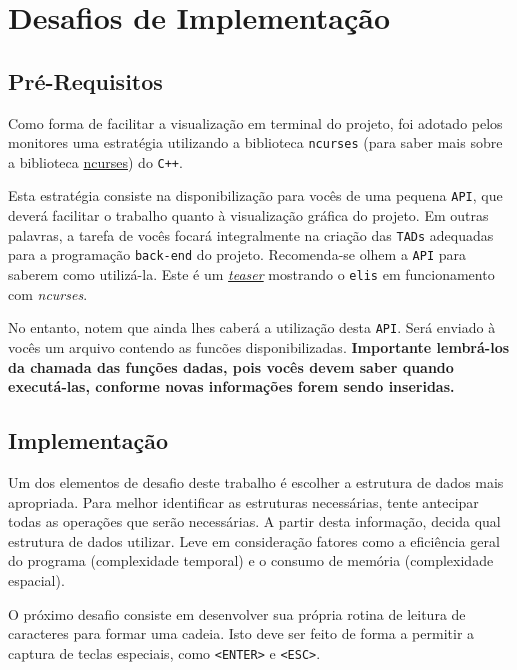 \documentclass[11pt,a4paper]{article}
\begin{document}
\section{Desafios de Implementação}
\label{subsec:parteI:desafios}

\subsection{Pré-Requisitos}

Como forma de facilitar a visualização em terminal do projeto, foi adotado pelos monitores uma estratégia utilizando a biblioteca \texttt{ncurses} (para saber mais sobre a biblioteca \href{http://bit.do/eAJR6}{ncurses}) do \texttt{C++}.



Esta estratégia consiste na disponibilização para vocês de uma pequena \texttt{API}, que deverá facilitar o trabalho quanto à visualização gráfica do projeto. Em outras palavras, a tarefa de vocês focará integralmente na criação das \texttt{TADs} adequadas para a programação \texttt{back-end} do projeto. Recomenda-se olhem a \texttt{API} para saberem como utilizá-la. Este é um \href{}{\textit{teaser}} mostrando o \texttt{elis} em funcionamento com \emph{ncurses}. 

No entanto, notem que ainda lhes caberá a utilização desta \texttt{API}. Será enviado à vocês um arquivo contendo as funcões disponibilizadas. \textbf{Importante lembrá-los da chamada das funções dadas, pois vocês devem saber quando executá-las, conforme novas informações forem sendo inseridas.}

\subsection{Implementação}

Um dos elementos de desafio deste trabalho é escolher a estrutura de dados mais
apropriada.
Para melhor identificar as estruturas necessárias, tente antecipar todas as
operações que serão necessárias.
A partir desta informação, decida qual estrutura de dados utilizar.
Leve em consideração fatores como a eficiência geral do programa (complexidade temporal) e o
consumo de memória (complexidade espacial).

O próximo desafio consiste em desenvolver sua própria rotina de leitura de caracteres
para formar uma cadeia.
Isto deve ser feito de forma a permitir a captura de teclas especiais, como \texttt{<ENTER>}
e \texttt{<ESC>}.
\end{document}
